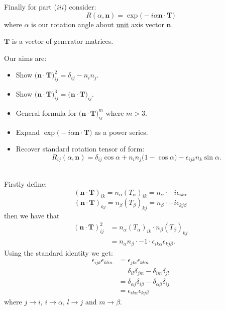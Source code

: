 \begin{enumerate}
    \newpage

    Finally for part ($iii$) consider:
    $$R(\alpha,\boldsymbol{n})=\exp\bigl(-i\alpha\boldsymbol{n}
    \cdot\boldsymbol{T}\bigl)$$
    where $\alpha$ is our rotation angle about \underline{unit} axis vector $\boldsymbol{n}$.

    $\boldsymbol{T}$ is a vector of generator matrices.

    Our aims are:
    \begin{itemize}
        \item Show $\bigl(\boldsymbol{n}\cdot\boldsymbol{T}\bigl)^2_{ij}
        =\delta_{ij}-n_i n_j$.

        \item Show $\bigl(\boldsymbol{n}\cdot\boldsymbol{T}\bigl)^3_{ij}
        =\bigl(\boldsymbol{n}\cdot\boldsymbol{T}\bigl)_{ij}$.

        \item General formula for
        $\bigl(\boldsymbol{n}\cdot\boldsymbol{T}\bigl)^m_{ij}$
        where $m>3$.

        \item Expand $\exp\bigl(-i\alpha\boldsymbol{n}
        \cdot\boldsymbol{T}\bigl)$ as a power series.

        \item Recover standard rotation tensor of form:
        $$R_{ij}(\alpha,\boldsymbol{n})
        =\delta_{ij}\cos\alpha+n_i n_j\bigl(1-\cos\alpha\bigl)
        -\epsilon_{ijk}n_k\sin\alpha.$$ \\
    \end{itemize}

    Firstly define:
    $$(\boldsymbol{n}\cdot\boldsymbol{T})_{ik}
    =n_{\alpha}(T_{\alpha})_{ik}=n_{\alpha}\cdot -i\epsilon_{ik\alpha}$$
    $$(\boldsymbol{n}\cdot\boldsymbol{T})_{kj}
    =n_{\beta}(T_{\beta})_{kj}=n_{\beta}\cdot -i\epsilon_{kj\beta}$$
    then we have that
    \begin{align*}
        (\boldsymbol{n}\cdot\boldsymbol{T})^2_{ij}
        &=n_{\alpha}(T_{\alpha})_{ik}\cdot n_{\beta}(T_{\beta})_{kj} \\
        &=n_{\alpha}n_{\beta}\cdot -1\cdot\epsilon_{ik\alpha}\epsilon_{kj\beta}.
    \end{align*}
    Using the standard identity we get:
    \begin{align*}
        \epsilon_{ijk}\epsilon_{klm}
        &=\epsilon_{jki}\epsilon_{klm} \\
        &=\delta_{il}\delta_{jm}-\delta_{im}\delta_{jl} \\
        &=\delta_{\alpha j}\delta_{i\beta}-\delta_{\alpha\beta}\delta_{ij} \\
        &=\epsilon_{ik\alpha}\epsilon_{kj\beta}
    \end{align*}
    where $j\rightarrow i$, $i\rightarrow\alpha$, $l\rightarrow j$
    and $m\rightarrow\beta$.


\end{enumerate}
